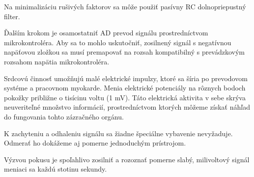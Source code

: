 \documentclass[titlepage]{article}
\begin{document}
\newpage
Na minimalizáciu rušivých faktorov sa môže použiť pasívny RC dolnopriepustný filter.

Ďalším krokom je osamostatniť AD prevod signálu prostredníctvom mikrokontroléra. Aby sa to mohlo uskutočniť, zosilnený signál s negatívnou napäťovou zložkou sa musí premapovať  na rozsah kompatibilný s prevádzkovým rozsahom napätia mikrokontroléra.

Srdcovú činnosť umožňujú malé elektrické impulzy, ktoré sa šíria po prevodovom systéme a pracovnom myokarde. Menia elektrické potenciály na rôznych bodoch pokožky približne o tisícinu voltu (1 mV). Táto elektrická aktivita v sebe skrýva neuveriteľné množstvo informácií, prostredníctvom ktorých môžeme získať náhľad do fungovania tohto zázračného orgánu.

K zachyteniu a odhaleniu signálu sa žiadne špeciálne vybavenie nevyžaduje. Odmerať ho dokážeme aj pomerne jednoduchým prístrojom.

Výzvou pokusu je spoľahlivo zosilniť a rozoznať pomerne slabý, milivoltový signál meniaci sa každú stotinu sekundy.

\newpage
\end{document}
